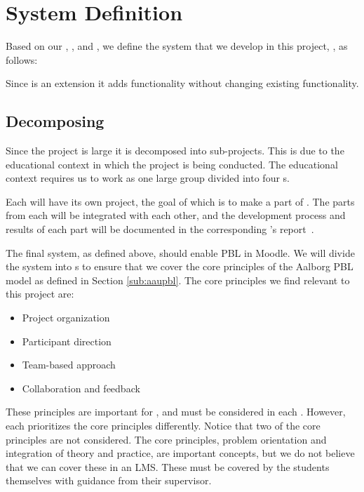 \chapter{System Definition}
\label{sec:systemDef}
\label{chap:systemDef}
Based on our , , and , we define the system that we develop in this project, \system{}, as follows:


Since \system{} is an extension it adds functionality without changing existing functionality.


\section{Decomposing \system}
\label{sub:decomposingSys}
Since the project is large it is decomposed into sub-projects.
This is due to the educational context in which the project is being conducted.
The educational context requires us to work as one large group divided into four \subgroup{}s.

Each \subgroup{} will have its own project, the goal of which is to make a part of \system{}.
The parts from each \subgroup{} will be integrated with each other, and the development process and results of each part will be documented in the corresponding \subgroup{}'s report~\cite{sw6studieordning}.

The final system, as defined above, should enable PBL in Moodle.
We will divide the system into \subsystem{}s to ensure that we cover the core principles of the Aalborg PBL model as defined in Section \ref{sub:aaupbl}.
The core principles we find relevant to this project are:

\begin{itemize}
    \item Project organization
    \item Participant direction
    \item Team-based approach
    \item Collaboration and feedback
\end{itemize}

These principles are important for \system{}, and must be considered in each \subsystem{}.
However, each \subsystem{} prioritizes the core principles differently.
Notice that two of the core principles are not considered.
The core principles, problem orientation and integration of theory and practice, are important concepts, but we do not believe that we can cover these in an LMS.
These must be covered by the students themselves with guidance from their supervisor.


